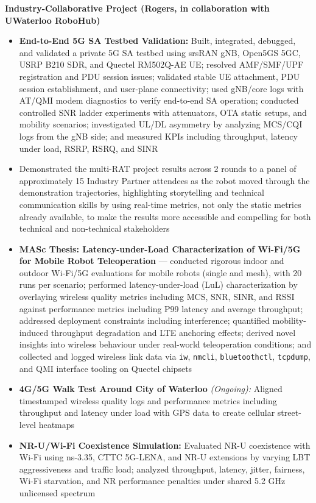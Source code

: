 \documentclass[letterpaper,11pt]{article}
\begin{document}
\item \textbf{Industry-Collaborative Project (Rogers, in collaboration with UWaterloo RoboHub)}
\begin{itemize}[leftmargin=1.5em]
 \item \textbf{End-to-End 5G SA Testbed Validation:} Built, integrated, debugged, and validated a private 5G SA testbed using srsRAN gNB, Open5GS 5GC, USRP B210 SDR, and Quectel RM502Q-AE UE; resolved AMF/SMF/UPF registration and PDU session issues; validated stable UE attachment, PDU session establishment, and user-plane connectivity; used gNB/core logs with AT/QMI modem diagnostics to verify end-to-end SA operation; conducted controlled SNR ladder experiments with attenuators, OTA static setups, and mobility scenarios; investigated UL/DL asymmetry by analyzing MCS/CQI logs from the gNB side; and measured KPIs including throughput, latency under load, RSRP, RSRQ, and SINR

\item Demonstrated the multi-RAT project results across 2 rounds to a panel of approximately 15 Industry Partner attendees as the robot moved through the demonstration trajectories, highlighting storytelling and technical communication skills by using real-time metrics, not only the static metrics already available, to make the results more accessible and compelling for both technical and non-technical stakeholders


 
\item \textbf{MASc Thesis: Latency-under-Load Characterization of Wi-Fi/5G for Mobile Robot Teleoperation} — conducted rigorous indoor and outdoor Wi-Fi/5G evaluations for mobile robots (single and mesh), with 20 runs per scenario; performed latency-under-load (LuL) characterization by overlaying wireless quality metrics including MCS, SNR, SINR, and RSSI against performance metrics including P99 latency and average throughput; addressed deployment constraints including interference; quantified mobility-induced throughput degradation and LTE anchoring effects; derived novel insights into wireless behaviour under real-world teleoperation conditions; and collected and logged wireless link data via \texttt{iw}, \texttt{nmcli}, \texttt{bluetoothctl}, \texttt{tcpdump}, and QMI interface tooling on Quectel chipsets




\item \textbf{4G/5G Walk Test Around City of Waterloo} \textit{(Ongoing):} Aligned timestamped wireless quality logs and performance metrics including throughput and latency under load with GPS data to create cellular street-level heatmaps

   \item \textbf{NR-U/Wi-Fi Coexistence Simulation:} Evaluated NR-U coexistence with Wi-Fi using ns-3.35, CTTC 5G-LENA, and NR-U extensions by varying LBT aggressiveness and traffic load; analyzed throughput, latency, jitter, fairness, Wi-Fi starvation, and NR performance penalties under shared 5.2 GHz unlicensed spectrum
    
\end{itemize}
\end{document}
